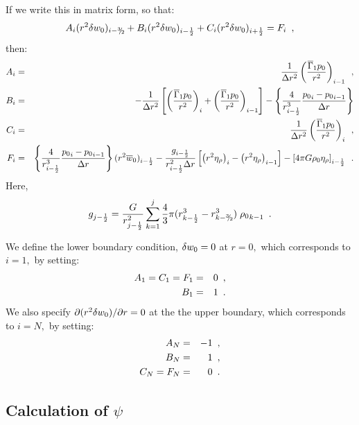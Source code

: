 If we write this in matrix form, so that:
\begin{equation}
A_i (r^2 \dw)_{i-\thalf} + B_i (r^2 \dw)_{i-\half} + C_i (r^2 \dw)_{i+\half} = F_i\enskip,
\end{equation}
then:
\begin{eqnarray}
A_i &=& \frac{1}{\Delta r^2} \left( \frac{\overline{\Gamma}_1 p_0}{r^2}\right)_{i-1}  \enskip, \nonumber  \\
B_i &=& -\frac{1}{\Delta r^2} \left[ \left( \frac{\overline{\Gamma}_1 p_0}{r^2}\right)_{i  }  
               +\left( \frac{\overline{\Gamma}_1 p_0}{r^2}\right)_{i-1} \right] 
              - \left\{ \frac{4}{r_{i-\frac{1}{2}} ^3} \frac{{p_0}_i - {p_0}_{i-1}}{\Delta r} \right\} \nonumber \\
C_i &=& \frac{1}{\Delta r^2} \left( \frac{\overline{\Gamma}_1 p_0}{r^2}\right)_{i}  \enskip, \nonumber  \\
F_i &=&  \left\{ \frac{4}{r_{i-\frac{1}{2}} ^3} \frac{{p_0}_i - {p_0}_{i-1}}{\Delta r} \right\} (r^2 \overline{w}_0)_{i-\frac{1}{2}}
 - \frac{g_{i-\frac{1}{2}}}{r_{i-\frac{1}{2}}^2 \Delta r} 
\left[ \left( r^2 \eta_{\rho} \right)_{i} - \left( r^2 \eta_{\rho}  \right)_{i-1} \right] 
- \left[  4 \pi G \rho_0 \eta_{\rho}   \right]_{i-\frac{1}{2}} \enskip \nonumber .
\end{eqnarray}
Here,
\begin{equation}
g_{j-\half} = \frac{G}{r_{j-\half}^2} \sum_{k=1}^{j} \frac{4}{3} \pi  (r_{k-\half}^3 - r_{k-\thalf}^3) \; {\rho_0}_{k-1} \enskip.
\end{equation}

We define the lower boundary condition, $ \delta w_0 = 0$ at $r=0,$ which
corresponds to $i=1,$ by setting:
\begin{eqnarray}
A_1 = C_1 = F_1 &=& 0\enskip, \nonumber \\
B_1 &=& 1\enskip. \nonumber
\end{eqnarray}
We also specify $\partial (r^2 \delta w_0) / \partial r = 0$ at the the upper boundary, which corresponds to $i=N,$
by setting:
\begin{eqnarray}
A_N &=& -1\enskip, \nonumber \\
B_N &=&  1\enskip, \nonumber \\
C_N = F_N &=& 0\enskip. \nonumber
\end{eqnarray}
\subsection{Calculation of $\psi$}

